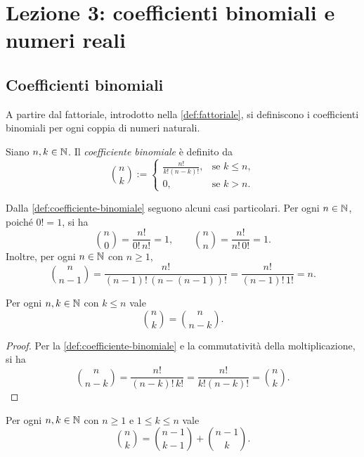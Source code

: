 \chapter[Lezione 3 --- 1 ottobre 2026]{Lezione 3: coefficienti binomiali e numeri reali}
\label{chap:lezione-03}

\section{Coefficienti binomiali}
\label{sec:lez03-coefficienti-binomiali}

A partire dal fattoriale, introdotto nella \cref{def:fattoriale},
si definiscono i coefficienti binomiali per ogni coppia di
numeri naturali.

\begin{definition}
\label{def:coefficiente-binomiale}
Siano \(n,k\in\mathbb{N}\). Il \emph{coefficiente binomiale} è definito da
\[
  \binom{n}{k}
  :=
  \begin{cases}
    \displaystyle\frac{n!}{k!(n-k)!}, & \text{se }k\le n,\\[8pt]
    0, & \text{se }k>n.
  \end{cases}
\]
\end{definition}

Dalla \cref{def:coefficiente-binomiale} seguono alcuni casi
particolari. Per ogni \(n\in\mathbb{N}\), poiché \(0!=1\), si ha
\[
  \binom{n}{0}=\frac{n!}{0!\,n!}=1,
  \qquad
  \binom{n}{n}=\frac{n!}{n!\,0!}=1.
\]
Inoltre, per ogni \(n\in\mathbb{N}\) con \(n\ge1\),
\[
  \binom{n}{n-1}
  =\frac{n!}{(n-1)!\,(n-(n-1))!}
  =\frac{n!}{(n-1)!\,1!}
  =n.
\]

\begin{proposition}
\label{prop:simmetria-coefficienti-binomiali}
Per ogni \(n,k\in\mathbb{N}\) con \(k\le n\) vale
\[
  \binom{n}{k}=\binom{n}{n-k}.
\]
\end{proposition}

\begin{proof}
Per la \cref{def:coefficiente-binomiale} e la commutatività
della moltiplicazione, si ha
\[
  \binom{n}{n-k}
  =\frac{n!}{(n-k)!\,k!}
  =\frac{n!}{k!(n-k)!}
  =\binom{n}{k}.
\]
\end{proof}

\begin{proposition}
\label{prop:identita-pascal}
Per ogni \(n,k\in\mathbb{N}\) con \(n\ge1\) e \(1\le k\le n\) vale
\[
  \binom{n}{k}
  =\binom{n-1}{k-1}+\binom{n-1}{k}.
\]
\end{proposition}

